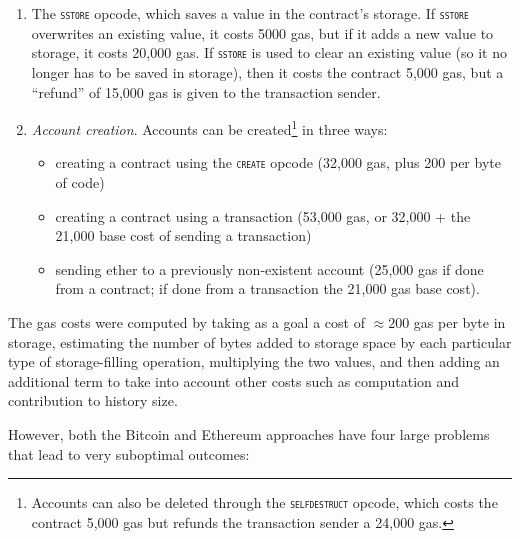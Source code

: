 \documentclass[12pt, final]{article}
\newcommand{\opcode}[1]{\textsc{\texttt{#1}}}
\begin{document}
\begin{enumerate}
    \item The \opcode{sstore} opcode, which saves a value in the contract's storage. If \opcode{sstore} overwrites an existing value, it costs 5000 gas, but if it adds a new value to storage, it costs 20,000 gas. If \opcode{sstore} is used to clear an existing value (so it no longer has to be saved in storage), then it costs the contract 5,000 gas, but a ``refund'' of 15,000 gas is given to the transaction sender.

    \item \emph{Account creation}. Accounts can be created\footnote{Accounts can also be deleted through the \opcode{selfdestruct} opcode, which costs the contract 5,000 gas but refunds the transaction sender a 24,000 gas.} in three ways:

    \begin{itemize}
        \item creating a contract using the \opcode{create} opcode (32,000 gas, plus 200 per byte of code)
        \item creating a contract using a transaction (53,000 gas, or 32,000 + the 21,000 base cost of sending a transaction)
        \item sending ether to a previously non-existent account (25,000 gas if done from a contract; if done from a transaction the 21,000 gas base cost).

    \end{itemize}

\end{enumerate}

The gas costs were computed by taking as a goal a cost of $\approx 200$ gas per byte in storage, estimating the number of bytes added to storage space by each particular type of storage-filling operation, multiplying the two values, and then adding an additional term to take into account other costs such as computation and contribution to history size.

However, both the Bitcoin and Ethereum approaches have four large problems that lead to very suboptimal outcomes:
\end{document}

